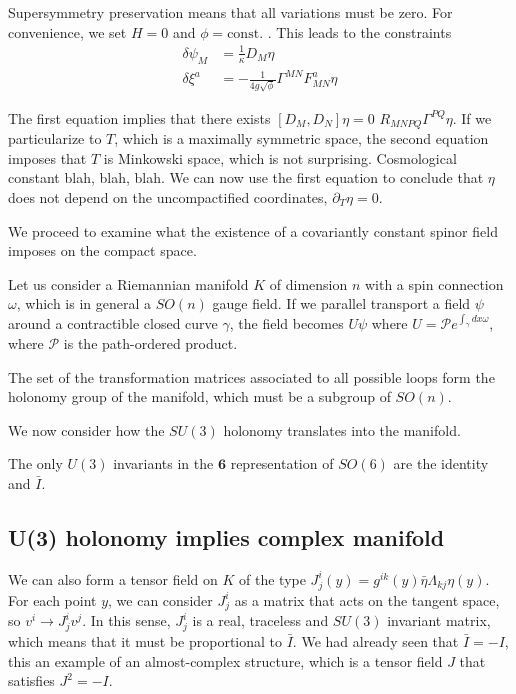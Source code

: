 Supersymmetry preservation means that all variations must be zero. 
For convenience, we set $H=0$ and $\phi=\mathrm{const.}$ .
This leads to the constraints
\begin{equation}
  \begin{align}
  \delta \psi_M &= \frac{1}{\kappa }D_M \eta\\ 
  \delta \xi^a &= -\frac{1}{4g\sqrt \phi} \Gamma^{MN} F^a_{MN} \eta 
  \end{align}
\end{equation}

The first equation implies that there exists $[D_M,D_N]\eta=0$ $R_{MNPQ} \Gamma^{PQ} \eta$.
If we particularize to $T$, which is a maximally symmetric space, the second equation imposes that
$T$ is Minkowski space, which is not surprising.
Cosmological constant blah, blah, blah.
We can now use the first equation to conclude that $\eta$ does not depend on the uncompactified 
coordinates,  $\partial_T \eta=0$.

We proceed to examine what the existence of a covariantly constant spinor field imposes on the compact space. 

Let us consider a Riemannian manifold $K$ of dimension $n$ with a spin connection $\omega$, which 
is in general a $SO(n)$ gauge field.
If we parallel transport a field $\psi$ around a contractible closed curve $\gamma$, the field becomes
$U\psi$ where $U=\mathcal P e^{\int_\gamma dx \omega}$, where $\mathcal P$ is the path-ordered product.

The set of the transformation matrices associated to all possible loops form the holonomy group of the manifold, 
which must be a subgroup of $SO(n)$.


We now consider how the $SU(3)$ holonomy translates into the manifold. 


The only  $U(3)$ invariants in the $\mathbf{6}$ representation of $SO(6)$ are the identity and
$\bar I$.

\subsection{U(3) holonomy implies complex manifold}

We can also form a tensor field on $K$ of the type $J^i_j(y)=g^{ik}(y) \bar\eta \Lambda_{kj} \eta(y)$.
For each point $y$, we can consider $J^i_j$ as a matrix that acts on the tangent space, so $v^i \to J^i_j v^j$.
In this sense, $J^i_j$ is a real, traceless and $SU(3)$ invariant matrix, which means that it must be proportional
to $\bar I$.
We had already seen that $\bar I = -I$, this an example of an almost-complex structure, which is 
a tensor field $J$ that satisfies $J^2=-I$.


